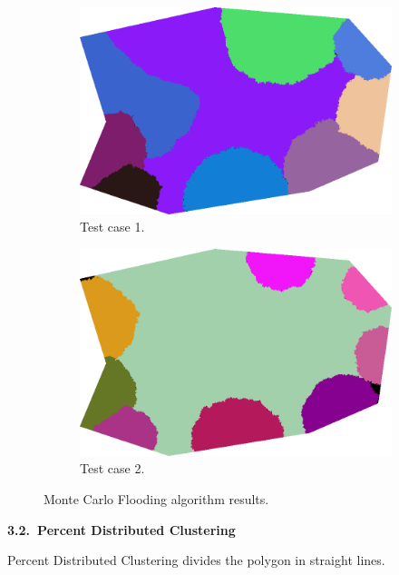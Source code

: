\documentclass[11pt,leqno]{book}
\newcommand{\subsect}[1]{\vskip 3mm\par{\bf#1}}
\begin{document}
\begin{figure}[h!]
\centering
\begin{subfigure}{.5\textwidth}
  \centering
  \includegraphics[width=.5\linewidth]{pic08.png}
  \caption{Test case 1.}
  \label{fig:sub7}
\end{subfigure}%
\begin{subfigure}{.5\textwidth}
  \centering
  \includegraphics[width=.5\linewidth]{pic09.png}
  \caption{Test case 2.}
  \label{fig:sub8}
\end{subfigure}
\caption{Monte Carlo Flooding algorithm results.}
\label{fig:five}
\end{figure}
\FloatBarrier

\subsect{3.2.~Percent Distributed Clustering}

Percent Distributed Clustering divides the polygon in straight lines.
\end{document}
